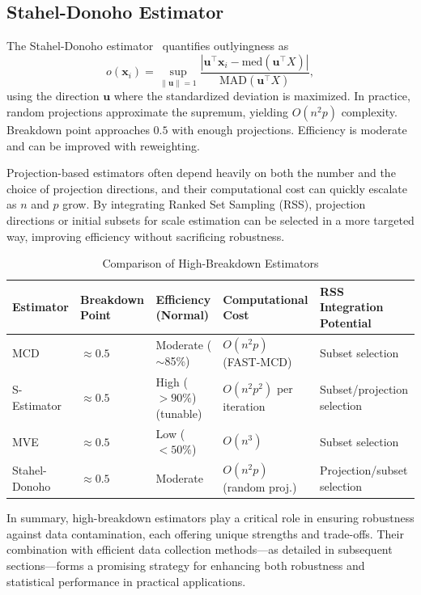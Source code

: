 \documentclass[12pt]{article}
\begin{document}
\subsection{Stahel-Donoho Estimator}
The Stahel-Donoho estimator~\cite{maronna2019robust} quantifies outlyingness as
\[
o(\mathbf{x}_i) = \sup_{\|\mathbf{u}\| = 1} \frac{|\mathbf{u}^\top \mathbf{x}_i - \text{med}(\mathbf{u}^\top X)|}{\text{MAD}(\mathbf{u}^\top X)},
\]
using the direction $\mathbf{u}$ where the standardized deviation is maximized. In practice, random projections approximate the supremum, yielding $O(n^2p)$ complexity.
Breakdown point approaches $0.5$ with enough projections. Efficiency is moderate and can be improved with reweighting.

Projection-based estimators often depend heavily on both the number and the choice of projection directions, and their computational cost can quickly escalate as $n$ and $p$ grow. By integrating Ranked Set Sampling (RSS), projection directions or initial subsets for scale estimation can be selected in a more targeted way, improving efficiency without sacrificing robustness.

\begin{table}[H]
\centering
\caption{Comparison of High-Breakdown Estimators}
\label{tab:estimator_comparison}
\begin{tabularx}{\textwidth}{lXXXX}
\toprule
\textbf{Estimator} & \textbf{Breakdown Point} & \textbf{Efficiency (Normal)} & \textbf{Computational Cost} & \textbf{RSS Integration Potential} \\
\midrule
MCD           & $\approx 0.5$ & Moderate ($\sim$85\%)  & $O(n^2p)$ (FAST-MCD)      & Subset selection            \\
S-Estimator   & $\approx 0.5$ & High ($>90\%$) (tunable) & $O(n^2p^2)$ per iteration & Subset/projection selection \\
MVE           & $\approx 0.5$ & Low ($<50\%$)           & $O(n^3)$                  & Subset selection            \\
Stahel-Donoho & $\approx 0.5$ & Moderate                & $O(n^2p)$ (random proj.)  & Projection/subset selection \\
\bottomrule
\end{tabularx}
\end{table}

In summary, high-breakdown estimators play a critical role in ensuring robustness against data contamination, each offering unique strengths and trade-offs. Their combination with efficient data collection methods---as detailed in subsequent sections---forms a promising strategy for enhancing both robustness and statistical performance in practical applications.
\end{document}

